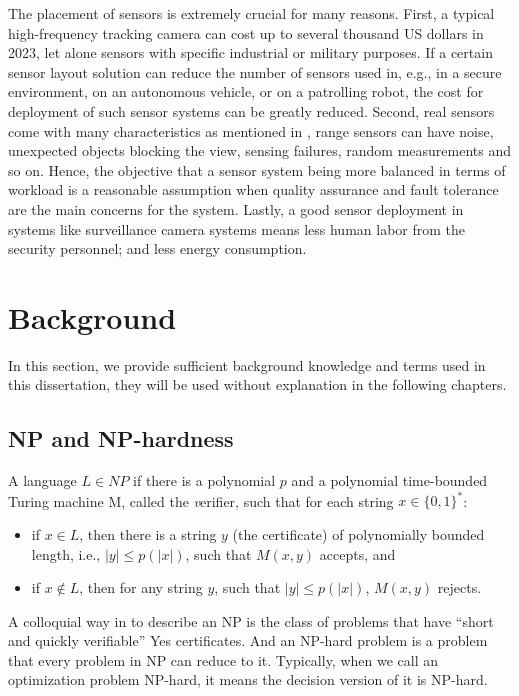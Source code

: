 The placement of sensors is extremely crucial for many reasons.
First, a typical high-frequency tracking camera can cost up to several thousand US dollars in 2023, 
let alone sensors with specific industrial or military purposes. If a certain sensor layout solution
can reduce the number of sensors used in, e.g., in a secure environment, on an autonomous vehicle, or on a patrolling robot,
the cost for deployment of such sensor systems can be greatly reduced.
Second, real sensors come with many characteristics as mentioned in \cite{sebastian2005prob},
range sensors can have noise, unexpected objects blocking the view, sensing failures, random measurements and so on.
Hence, the objective that a sensor system being more balanced in terms of workload is a reasonable assumption
when quality assurance and fault tolerance are the main concerns for the system. 
Lastly, a good sensor deployment in systems like surveillance camera systems means less human labor from the security personnel;
and less energy consumption.
\section{Background}
In this section, we provide sufficient background knowledge and terms used in this dissertation, 
they will be used without explanation in the following chapters. 

\subsection{NP and NP-hardness}
\begin{definition}
    A language $L\in NP$ if there is a polynomial $p$ and a polynomial time-bounded Turing machine M, 
    called the {\textit verifier}, such that for each string $x\in \{0, 1\}^*$: 
    \begin{itemize}
        \item if $x\in L$, then there is a string $y$ (the certificate) of polynomially bounded length, i.e., $|y| \leq p(|x|)$,
        such that $M(x, y)$ accepts, and 
        \item if $x\notin L$, then for any string $y$, such that $|y|\leq p(|x|)$, $M(x,y)$ rejects.
    \end{itemize}
\end{definition}

A colloquial way in \cite{vazirani2001approximation} to describe an NP is the class of problems that have ``short and quickly verifiable'' 
Yes certificates.
And an NP-hard problem is a problem that every problem in NP can reduce to it.
Typically, when we call an optimization problem NP-hard, it means the decision version of it is NP-hard.

